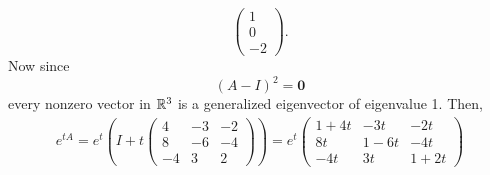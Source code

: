 \documentclass{exam}
\begin{document}
\begin{solution}
\[\begin{pmatrix}
            1 \\ 0 \\ -2
        \end{pmatrix}.
    \]
    Now since 
    \[
        (A-I)^2 = \mathbf{0}
    \]
    every nonzero vector in $\mathbb R^3$ is a generalized eigenvector of eigenvalue 1. Then,
    \begin{align*}
        e^{tA} = e^t\left(I + t \begin{pmatrix}
            4 & -3 & -2 \\
            8 & -6 & -4 \\
            -4 & 3 & 2
        \end{pmatrix}\right) = \boxed{
            e^t\begin{pmatrix}
                1 + 4t & -3t & -2t \\
                8t & 1-6t & -4t \\
                -4t & 3t & 1 + 2t
            \end{pmatrix}
        }
    \end{align*}
\end{solution}
\end{document}
